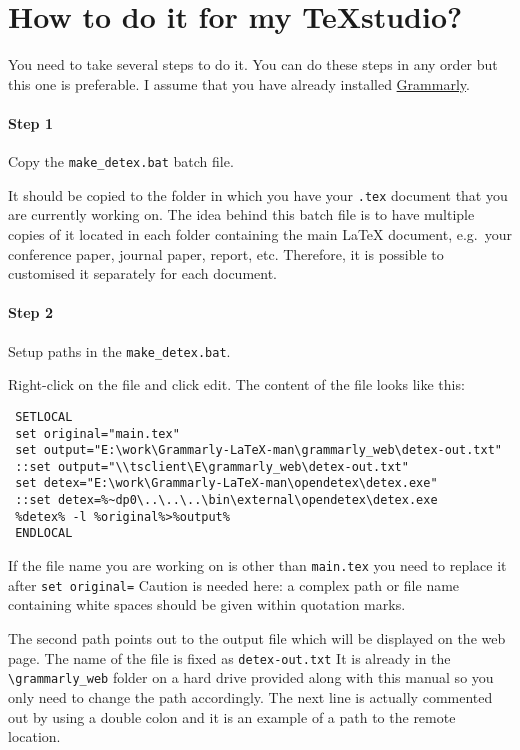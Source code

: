 \documentclass[]{spie}  %
\begin{document}
\section{How to do it for my TeXstudio?}
You need to take several steps to do it. You can do these steps in any order but this one is preferable. I assume that you have already installed \href{https://www.grammarly.com}{Grammarly}.
\paragraph{Step 1} Copy  the \verb|make_detex.bat| batch file. 

It should be copied to the folder in which you have your \verb|.tex| document that you are currently working on.
The idea behind this batch file is to have multiple copies of it located in each folder containing the main LaTeX document, e.g.\ your conference paper, journal paper, report, etc.
Therefore, it is possible to customised it separately for each document.

\paragraph{Step 2} Setup paths in the \verb|make_detex.bat|. 

Right-click on the file and click edit.
The content of the file looks like this:
 \begin{verbatim}
 SETLOCAL
 set original="main.tex"
 set output="E:\work\Grammarly-LaTeX-man\grammarly_web\detex-out.txt"
 ::set output="\\tsclient\E\grammarly_web\detex-out.txt"
 set detex="E:\work\Grammarly-LaTeX-man\opendetex\detex.exe"
 ::set detex=%~dp0\..\..\..\bin\external\opendetex\detex.exe
 %detex% -l %original%>%output%
 ENDLOCAL
 \end{verbatim}
If the file name you are working on is other than \verb|main.tex| you need to replace it after \verb|set original=|
Caution is needed here: a complex path or file name containing white spaces should be given within quotation marks.

The second path points out to the output file which will be displayed on the web page. The name of the file is fixed as \verb|detex-out.txt|
It is already in the \verb|\grammarly_web| folder on a hard drive provided along with this manual so you only need to change the path accordingly.
The next line is actually commented out by using a double colon and it is an example of a path to the remote location.
\end{document}
